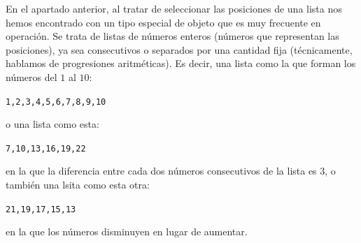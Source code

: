 \documentclass[10pt,a4paper]{article}\usepackage[]{graphicx}\usepackage[]{color}
\makeatletter
\newenvironment{kframe}{%
 \def\at@end@of@kframe{}%
 \ifinner\ifhmode%
  \def\at@end@of@kframe{\end{minipage}}%
  \begin{minipage}{\columnwidth}%
 \fi\fi%
 \def\FrameCommand##1{\hskip\@totalleftmargin \hskip-\fboxsep
 \colorbox{shadecolor}{##1}\hskip-\fboxsep
     \hskip-\linewidth \hskip-\@totalleftmargin \hskip\columnwidth}%
 \MakeFramed {\advance\hsize-\width
   \@totalleftmargin\z@ \linewidth\hsize
   \@setminipage}}%
 {\par\unskip\endMakeFramed%
 \at@end@of@kframe}
\newenvironment{knitrout}{}{} %
\newcounter {cont01}
\makeatother
\begin{document}
En el apartado anterior, al tratar de seleccionar las posiciones de una lista nos hemos encontrado con un tipo especial de objeto que es muy frecuente en operación. Se trata de listas de números enteros (números que representan las posiciones), ya sea consecutivos o separados por una cantidad fija (técnicamente, hablamos de {\sf progresiones aritméticas}). Es decir, una lista como la que forman los números del $1$ al $10$:
\begin{knitrout}
\color{fgcolor}\begin{kframe}
\begin{alltt}
1, 2, 3, 4, 5, 6, 7, 8, 9, 10
\end{alltt}
\end{kframe}
\end{knitrout}
o una lista como esta:
\begin{knitrout}
\color{fgcolor}\begin{kframe}
\begin{alltt}
7, 10, 13, 16, 19, 22
\end{alltt}
\end{kframe}
\end{knitrout}
en la que la diferencia entre cada dos números consecutivos de la lista es $3$, o también una lsita como esta otra:
\begin{knitrout}
\color{fgcolor}\begin{kframe}
\begin{alltt}
21, 19, 17, 15, 13
\end{alltt}
\end{kframe}
\end{knitrout}
en la que los números disminuyen en lugar de aumentar.
\end{document}
